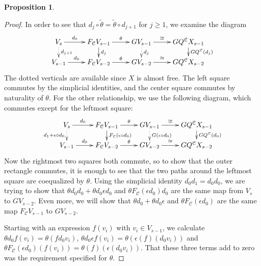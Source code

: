 \documentclass[11pt]{amsart}
\theoremstyle{plain}
\newtheorem{prop}[thm]{Proposition}
\theoremstyle{definition}
\newcommand{\calC}{\mathcal{C}}
\theoremstyle{plain}
\begin{document}
\begin{Conventions and notation}
\begin{prop}
\end{prop}
\begin{proof}
In order to see that $d_j\circ\widetilde{\theta}=\widetilde{\theta}\circ d_{j+1}$ for $j\geq1$, we examine the diagram
\[\xymatrix@R=4mm{
V_s\ar[r]^-{d_0}
\ar@{..>}[d]^-{d_{j+1}}
&%
F_\calC V_{s-1}\ar[r]^-{\theta}
\ar[d]^-{d_j}
&GV_{s-1}\ar[r]^-{\cong}
\ar@{..>}[d]^-{d_j}
&%
GQ^{\calC}X_{s-1}\ar[d]^-{GQ^{\calC}(d_j)}
\\%
V_{s-1}\ar[r]^-{d_0}
&%
F_\calC V_{s-2}\ar[r]^-{\theta}
&GV_{s-2}\ar[r]^-{\cong}
&%
GQ^{\calC}X_{s-2}
}\]
The dotted verticals are available since $X$ is almost free. The left square commutes by the simplicial identities, and the center square commutes by naturality of $\theta$. For the other relationship, we use the following diagram, which commutes except for the leftmost square:
\[\xymatrix@R=4mm{
V_s\ar[r]^-{d_0}
\ar@{..>}[d]_-{d_{1}+\epsilon\circ d_0}
&%
F_\calC V_{s-1}\ar[r]^-{\theta}
\ar[d]^-{F_{\calC}(\epsilon\circ d_0)}
&GV_{s-1}\ar[r]^-{\cong}
\ar@{..>}[d]^-{G(\epsilon\circ d_0)}
&%
GQ^{\calC}X_{s-1}\ar[d]^-{GQ^{\calC}(d_0)}
\\%
V_{s-1}\ar[r]^-{d_0}
&%
F_\calC V_{s-2}\ar[r]^-{\theta}
&GV_{s-2}\ar[r]^-{\cong}
&%
GQ^{\calC}X_{s-2}
}\]
Now the rightmost two squares both commute, so to show that the outer rectangle commutes, it is enough to see that the two paths around the leftmost square are coequalized by $\theta$. Using the simplicial identity $d_0 d_1=d_0d_0$, we are trying to show that $\theta d_0d_0+\theta d_0\epsilon d_0$ and $\theta F_{\calC}(\epsilon d_0) d_0$ are the same map from $V_s$ to $GV_{s-2}$. Even more, we will show that $\theta d_0+\theta d_0\epsilon$ and $\theta F_{\calC}(\epsilon d_0)$ are the same map $F_\calC V_{s-1}$ to $GV_{s-2}$.

Starting with an expression $f(v_i)$ with $v_i\in V_{s-1}$, we calculate $\theta d_0 f(v_i)=\theta (fd_0v_i)$, $\theta d_0\epsilon f(v_i)=\theta (\epsilon (f)(d_0v_i))$ and $\theta F_{\calC}(\epsilon d_0)(f(v_i))=\theta(f)(\epsilon(d_0v_i))$. That these three terms add to zero was the requirement specified for $\theta$.
\end{proof}

\end{Conventions and notation}
\end{document}
